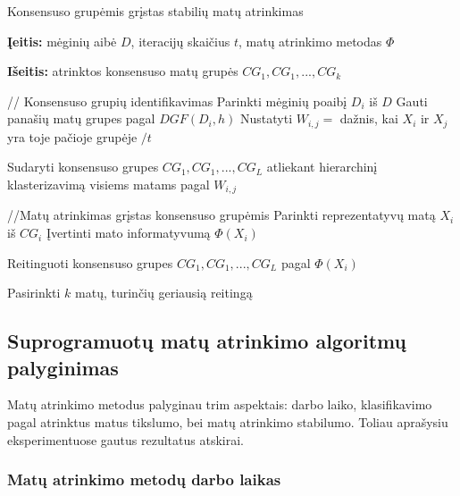 \begin{algorithm}
 \caption{Konsensuso grupėmis grįstas stabilių matų atrinkimas}
 \label{CGS}
 \begin{algorithmic}
   \item \textbf{Įeitis:} mėginių aibė $D$, iteracijų skaičius $t$, matų atrinkimo metodas $\Phi$\
   \item \textbf{Išeitis:} atrinktos konsensuso matų grupės $CG_1, CG_1,..., CG_k$
   \item // Konsensuso grupių identifikavimas
    \State Parinkti mėginių  poaibį $D_i$ iš $D$
    \State Gauti panašių matų grupes pagal $DGF(D_i, h)$
   \EndFor
    \State Nustatyti $W_{i,j}=$ dažnis, kai $X_i$ ir $X_j$ yra toje pačioje grupėje $/t$
   \EndFor
   \item Sudaryti konsensuso grupes $CG_1, CG_1,..., CG_L$ atliekant hierarchinį klasterizavimą visiems matams pagal $W_{i, j}$
   \item //Matų atrinkimas grįstas konsensuso grupėmis
    \State Parinkti reprezentatyvų matą $X_i$ iš $CG_i$
    \State Įvertinti mato informatyvumą $\Phi(X_i)$
   \EndFor
   \item Reitinguoti konsensuso grupes $CG_1, CG_1,..., CG_L$ pagal $\Phi(X_i)$
   \item Pasirinkti $k$ matų, turinčių geriausią reitingą  
 \end{algorithmic}
\end{algorithm}

\subsection{Suprogramuotų matų atrinkimo algoritmų palyginimas}

Matų atrinkimo metodus palyginau trim aspektais: darbo laiko, klasifikavimo pagal atrinktus matus tikslumo, bei matų atrinkimo stabilumo. Toliau aprašysiu eksperimentuose gautus rezultatus atskirai.
\subsubsection{Matų atrinkimo metodų darbo laikas}

